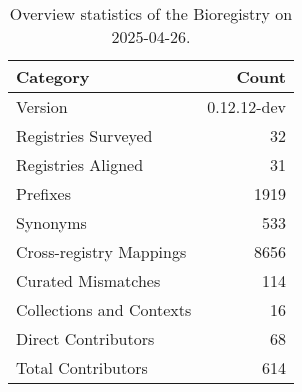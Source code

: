 \begin{table}
\caption{Overview statistics of the Bioregistry on 2025-04-26.}
\label{tab:bioregistry-summary}
\begin{tabular}{lr}
\toprule
Category & Count \\
\midrule
Version & 0.12.12-dev \\
Registries Surveyed & 32 \\
Registries Aligned & 31 \\
Prefixes & 1919 \\
Synonyms & 533 \\
Cross-registry Mappings & 8656 \\
Curated Mismatches & 114 \\
Collections and Contexts & 16 \\
Direct Contributors & 68 \\
Total Contributors & 614 \\
\bottomrule
\end{tabular}
\end{table}
